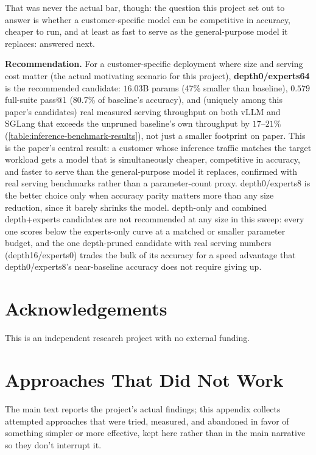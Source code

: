 \documentclass{article}
\theoremstyle{plain}
\theoremstyle{definition}
\theoremstyle{remark}
\begin{document}
That was never the actual bar, though: the question this project set
out to answer is whether a customer-specific model can be competitive
in accuracy, cheaper to run, and at least as fast to serve as the
general-purpose model it replaces: answered next.

\textbf{Recommendation.} For a customer-specific deployment where size
and serving cost matter (the actual motivating scenario for this
project), \textbf{depth0/experts64} is the recommended candidate:
$16.03$B params (47\% smaller than baseline), $0.579$ full-suite pass@1
(80.7\% of baseline's accuracy), and (uniquely among this paper's
candidates) real measured serving throughput on both vLLM and SGLang
that exceeds the unpruned baseline's own throughput by $17$--$21\%$
(\cref{table:inference-benchmark-results}), not just a smaller footprint
on paper. This is the paper's central result: a customer whose inference
traffic matches the target workload gets a model that is simultaneously
cheaper, competitive in accuracy, and faster to serve than the
general-purpose model it replaces, confirmed with real serving
benchmarks rather than a parameter-count proxy. depth0/experts8 is the
better choice only when accuracy parity matters more than any size
reduction, since it barely shrinks the model. depth-only and combined
depth+experts candidates are not recommended at any size in this sweep:
every one scores below the experts-only curve at a matched or smaller
parameter budget, and the one depth-pruned candidate with real serving
numbers (depth16/experts0) trades the bulk of its accuracy for a speed
advantage that depth0/experts8's near-baseline accuracy does not require
giving up.

\section*{Acknowledgements}
This is an independent research project with no external funding.




\clearpage
\appendix
\section{Approaches That Did Not Work}
\label{app:negative-results}

The main text reports the project's actual findings; this appendix
collects attempted approaches that were tried, measured, and abandoned
in favor of something simpler or more effective, kept here rather than
in the main narrative so they don't interrupt it.
\end{document}
